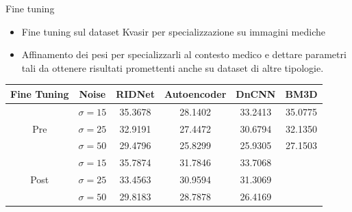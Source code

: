 \documentclass{beamer}
\begin{document}
\begin{frame}{Fine tuning}
    \begin{itemize}
        \item Fine tuning sul dataset Kvasir per specializzazione su immagini mediche
        \item Affinamento dei pesi per specializzarli al contesto medico e dettare parametri tali da ottenere risultati promettenti anche su dataset di altre tipologie.
    \end{itemize}

    \begin{table}[h]
        \centering
        \small
        \begin{tabular}{|c|c|c|c|c|c|}
            \hline
            \rowcolor{orange!20} %
            \textbf{Fine Tuning} & \textbf{Noise} & \textbf{RIDNet} & \textbf{Autoencoder} & \textbf{DnCNN} & \textbf{BM3D} \\
            \hline
            \multirow{3}{*}{Pre}    & $\sigma=15$ & 35.3678 & 28.1402 & 33.2413 & 35.0775 \\
                   &\rowcolor{blue!10}\cellcolor{orange!20}$\sigma=25$ & 32.9191 & 27.4472 & 30.6794 & 32.1350 \\
                                    & $\sigma=50$ & 29.4796 & 25.8299 & 25.9305 & 27.1503 \\
            \hline                        
            \multirow{3}{*}{Post}
            &\cellcolor{orange!20}\rowcolor{blue!10}$\sigma=15$ & 35.7874 & 31.7846 & 33.7068 & \cellcolor{white} \\
                                    & $\sigma=25$ & 33.4563 & 30.9594 & 31.3069 & \\
                   &\cellcolor{orange!20}\rowcolor{blue!10}$\sigma=50$ & 29.8183 & 28.7878 & 26.4169 & \cellcolor{white} \\
            \hline
        \end{tabular}
    \end{table}

\end{frame}
\end{document}

